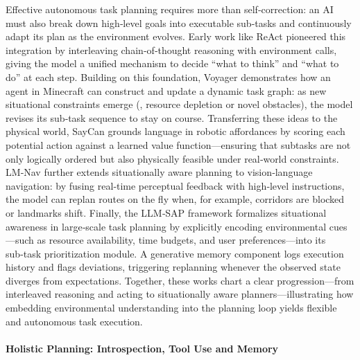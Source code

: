 Effective autonomous task planning requires more than self‑correction: an AI must also break down high‑level goals into executable sub‑tasks and continuously adapt its plan as the environment evolves. Early work like ReAct \citep{yao2023react} pioneered this integration by interleaving chain‑of‑thought reasoning with environment calls, giving the model a unified mechanism to decide ``what to think'' and ``what to do'' at each step. Building on this foundation, Voyager \citep{wangvoyager} demonstrates how an agent in Minecraft can construct and update a dynamic task graph: as new situational constraints emerge (\eg, resource depletion or novel obstacles), the model revises its sub‑task sequence to stay on course.  
Transferring these ideas to the physical world, SayCan \citep{ahn2022can} grounds language in robotic affordances by scoring each potential action against a learned value function—ensuring that subtasks are not only logically ordered but also physically feasible under real‑world constraints. LM‑Nav \citep{shah2023lm} further extends situationally aware planning to vision‑language navigation: by fusing real‑time perceptual feedback with high‑level instructions, the model can replan routes on the fly when, for example, corridors are blocked or landmarks shift.  
Finally, the LLM‑SAP framework \citep{wang2024llm} formalizes situational awareness in large‑scale task planning by explicitly encoding environmental cues—such as resource availability, time budgets, and user preferences—into its sub‑task prioritization module. A generative memory component logs execution history and flags deviations, triggering replanning whenever the observed state diverges from expectations. Together, these works chart a clear progression—from interleaved reasoning and acting to situationally aware planners—illustrating how embedding environmental understanding into the planning loop yields flexible and autonomous task execution.  


\paragraph{Holistic Planning: Introspection, Tool Use and Memory}

